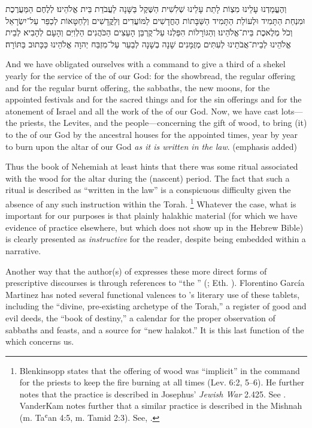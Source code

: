 \begin{hebrewtext}
    וְהֶעֱמַדְנוּ עָלֵינוּ מִצְוֹת לָתֵת עָלֵינוּ שְׁלִשִׁית הַשֶּׁקֶל בַּשָּׁנָה לַעֲבֹדַת בֵּית אֱלֹהֵינוּ׃ 
    לְלֶחֶם הַמַּעֲרֶכֶת וּמִנְחַת הַתָּמִיד וּלְעוֹלַת הַתָּמִיד הַשַּׁבָּתוֹת הֶחֳדָשִׁים לַמּוֹעֲדִים וְלַקֳּדָשִׁים וְלַחַטָּאוֹת לְכַפֵּר עַל־יִשְׂרָאֵל וְכֹל מְלֶאכֶת בֵּית־אֱלֹהֵינוּ׃
    וְהַגּוֹרָלוֹת הִפַּלְנוּ עַל־קֻרְבַּן הָעֵצִים הַכֹּהֲנִים הַלְוִיִּם וְהָעָם לְהָבִיא לְבֵית אֱלֹהֵינוּ לְבֵית־אֲבֹתֵינוּ לְעִתִּים מְזֻמָּנִים שָׁנָה בְשָׁנָה לְבַעֵר עַל־מִזְבַּח יְהוָה אֱלֹהֵינוּ כַּכָּתוּב בַּתּוֹרָה׃
\end{hebrewtext}
\begin{translation}
    And we have obligated ourselves with a command to give a third of a shekel yearly for the service of the \temple of our God:
    for the showbread, the regular offering and for the regular burnt offering, the sabbaths, the new moons, for the appointed festivals and for the sacred things and for the sin offerings and for the atonement of Israel and all the work of the \temple of our God.
    Now, we have cast lots---the priests, the Levites, and the people---concerning the gift of wood, to bring (it) to the \temple of our God by the ancestral houses for the appointed times, year by year to burn upon the altar of \yahweh our God \emph{as it is written in the law}. (emphasis added)
\end{translation}
\noindent
Thus the book of Nehemiah at least hints that there was some ritual associated with the wood for the altar during the (nascent) \secondtemple period. The fact that such a ritual is described as ``written in the law'' is a conspicuous difficulty given the absence of any such instruction within the Torah.%
    \footnote{Blenkinsopp states that the offering of wood was ``implicit'' in the command for the priests to keep the fire burning at all times (Lev. 6:2, 5--6). He further notes that the practice is described in Josephus' \emph{Jewish War} 2.425. See \cite[317]{blenkinsopp1988}. VanderKam notes further that a similar practice is described in the Mishnah (m. Taʿan 4:5, m. Tamid 2:3). See, \cite[636]{vanderkam2018}.}
Whatever the case, what is important for our purposes is that plainly halakhic material (for which we have evidence of practice elsewhere, but which does not show up in the Hebrew Bible) is clearly presented as \emph{instructive} for the reader, despite being embedded within a narrative.

Another way that the author(s) of \jub expresses these more direct forms of prescriptive discourses is through references to ``the \heavenlytablets'' (\HT; Eth. ). Florentino García Martinez has noted several functional valences to \jub's literary use of these tablets, including  the ``divine, pre-existing archetype of the Torah,'' a register of good and evil deeds, the ``book of destiny,'' a calendar for the proper observation of sabbaths and feasts, and a source for ``new halakot.''\autocite{martinez_najman-tigchelaar2012} It is this last function of the \HT which concerns us.

